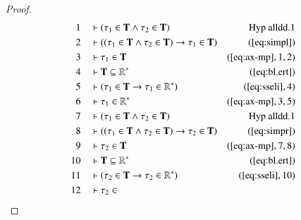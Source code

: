 \blalldd

\begin{proof}\label{proof:bl.alldd}
\begin{align}
  1 &&  & \vdash ( \tau_1 \in \mathbf{T} \wedge \tau_2 \in \mathbf{T}
      )&\text{Hyp~alldd.1}\notag%
  \\ 2 &&  & \vdash ( ( \tau_1 \in \mathbf{T} \wedge \tau_2 \in \mathbf{T} )
      \rightarrow \tau_1 \in \mathbf{T}
      )&(\mbox{\ref{eq:simpl}})\notag
  \\ 3 &&  & \vdash \tau_1 \in \mathbf{T}&(\mbox{\ref{eq:ax-mp}},1,2)\notag
  \\ 4 &&  & \vdash \mathbf{T} \subseteq
      \mathbb{R}^{\ast}&(\mbox{\ref{eq:bl.ert}})\notag
  \\ 5 &&  & \vdash ( \tau_1 \in \mathbf{T} \rightarrow \tau_1 \in
      \mathbb{R}^{\ast} )&(\mbox{\ref{eq:sseli}},4)\notag
  \\ 6 &&  & \vdash \tau_1 \in \mathbb{R}^{\ast}&(\mbox{\ref{eq:ax-mp}},3,5)\notag
  \\ 7 &&  & \vdash ( \tau_1 \in \mathbf{T} \wedge \tau_2 \in \mathbf{T}
      )&\text{Hyp~alldd.1}\notag%
  \\ 8 &&  & \vdash ( ( \tau_1 \in \mathbf{T} \wedge \tau_2 \in \mathbf{T} )
      \rightarrow \tau_2 \in \mathbf{T}
      )&(\mbox{\ref{eq:simpr}})\notag
  \\ 9 &&  & \vdash \tau_2 \in \mathbf{T}&(\mbox{\ref{eq:ax-mp}},7,8)\notag
  \\ 10 &&  & \vdash \mathbf{T} \subseteq
      \mathbb{R}^{\ast}&(\mbox{\ref{eq:bl.ert}})\notag
  \\ 11 &&  & \vdash ( \tau_2 \in \mathbf{T} \rightarrow \tau_2 \in
      \mathbb{R}^{\ast} )&(\mbox{\ref{eq:sseli}},10)\notag
  \\ 12 &&  & \vdash \tau_2 \in

\end{align}
\end{proof}
